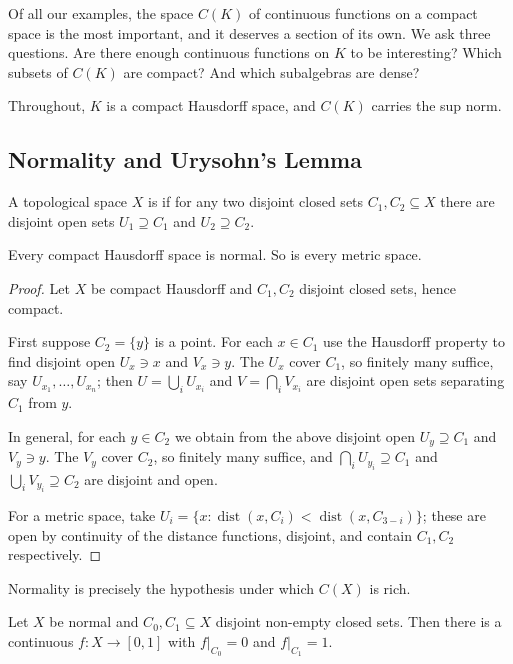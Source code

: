 \documentclass[a4paper]{scrartcl}
\DeclareMathOperator{\dist}{dist}
\begin{document}
Of all our examples, the space $C(K)$ of continuous functions on a compact space is the most important, and it deserves a section of its own. We ask three questions. Are there enough continuous functions on $K$ to be interesting? Which subsets of $C(K)$ are compact? And which subalgebras are dense?

Throughout, $K$ is a compact Hausdorff space, and $C(K)$ carries the sup norm.

\subsection{Normality and Urysohn's Lemma}

\begin{definition}
	A topological space $X$ is  if for any two disjoint closed sets $C_1, C_2 \subseteq X$ there are disjoint open sets $U_1 \supseteq C_1$ and $U_2 \supseteq C_2$.
\end{definition}

\begin{proposition}
	Every compact Hausdorff space is normal. So is every metric space.
\end{proposition}

\begin{proof}
	Let $X$ be compact Hausdorff and $C_1, C_2$ disjoint closed sets, hence compact.

	First suppose $C_2 = \{y\}$ is a point. For each $x \in C_1$ use the Hausdorff property to find disjoint open $U_x \ni x$ and $V_x \ni y$. The $U_x$ cover $C_1$, so finitely many suffice, say $U_{x_1},\dots,U_{x_n}$; then $U = \bigcup_i U_{x_i}$ and $V = \bigcap_i V_{x_i}$ are disjoint open sets separating $C_1$ from $y$.

	In general, for each $y \in C_2$ we obtain from the above disjoint open $U_y \supseteq C_1$ and $V_y \ni y$. The $V_y$ cover $C_2$, so finitely many suffice, and $\bigcap_i U_{y_i} \supseteq C_1$ and $\bigcup_i V_{y_i} \supseteq C_2$ are disjoint and open.

	For a metric space, take $U_i = \{x : \dist(x,C_i) < \dist(x,C_{3-i})\}$; these are open by continuity of the distance functions, disjoint, and contain $C_1, C_2$ respectively.
\end{proof}

Normality is precisely the hypothesis under which $C(X)$ is rich.

\begin{lemma}
	Let $X$ be normal and $C_0, C_1 \subseteq X$ disjoint non-empty closed sets. Then there is a continuous $f : X \to [0,1]$ with $f|_{C_0} = 0$ and $f|_{C_1} = 1$.
\end{lemma}
\end{document}
